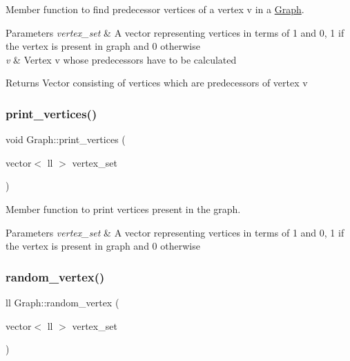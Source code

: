 Member function to find predecessor vertices of a vertex v in a \hyperlink{classGraph}{Graph}. 


\begin{DoxyParams}{Parameters}
{\em vertex\+\_\+set} & A vector representing vertices in terms of 1 and 0, 1 if the vertex is present in graph and 0 otherwise \\
\hline
{\em v} & Vertex v whose predecessors have to be calculated \\
\hline
\end{DoxyParams}
\begin{DoxyReturn}{Returns}
Vector consisting of vertices which are predecessors of vertex v 
\end{DoxyReturn}
\mbox{\label{classGraph_a2499f1d9980b0f630896d73e714e6603}} 
\subsubsection{\texorpdfstring{print\+\_\+vertices()}{print\_vertices()}}
{\footnotesize\ttfamily void Graph\+::print\+\_\+vertices (\begin{DoxyParamCaption}\item[{vector$<$ ll $>$}]{vertex\+\_\+set }\end{DoxyParamCaption})\hspace{0.3cm}{\ttfamily [inline]}}



Member function to print vertices present in the graph. 


\begin{DoxyParams}{Parameters}
{\em vertex\+\_\+set} & A vector representing vertices in terms of 1 and 0, 1 if the vertex is present in graph and 0 otherwise \\
\hline
\end{DoxyParams}
\mbox{\label{classGraph_ad0fce42e87adc80b81a11baa1331edb9}} 
\subsubsection{\texorpdfstring{random\+\_\+vertex()}{random\_vertex()}}
{\footnotesize\ttfamily ll Graph\+::random\+\_\+vertex (\begin{DoxyParamCaption}\item[{vector$<$ ll $>$}]{vertex\+\_\+set }\end{DoxyParamCaption})\hspace{0.3cm}{\ttfamily [inline]}}



